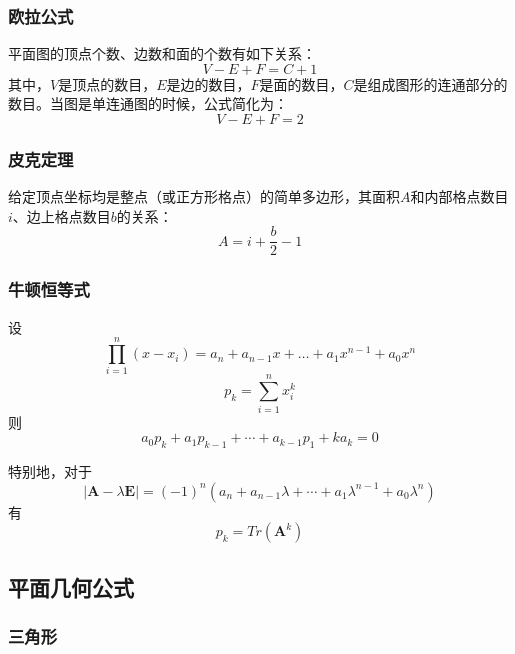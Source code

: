 \documentclass[a4paper]{ctexart}
\begin{document}
\subsubsection{欧拉公式}

平面图的顶点个数、边数和面的个数有如下关系：
$$V - E + F = C+ 1$$
\indent 其中，$V$是顶点的数目，$E$是边的数目，$F$是面的数目，$C$是组成图形的连通部分的数目。当图是单连通图的时候，公式简化为：
$$V - E + F = 2$$

\subsubsection{皮克定理}

给定顶点坐标均是整点（或正方形格点）的简单多边形，其面积$A$和内部格点数目$i$、边上格点数目$b$的关系：
$$A = i + \frac{b}{2} - 1$$

\subsubsection{牛顿恒等式}

设$$\prod_{i = 1}^n{(x - x_i)} = a_n + a_{n - 1} x + \dots + a_1 x^{n - 1} + a_0 x^n$$
$$p_k = \sum_{i = 1}^n{x_i^k}$$
则$$a_0 p_k + a_1 p_{k - 1} + \cdots + a_{k - 1} p_1 + k a_k = 0$$

特别地，对于$$|\bm{A} - \lambda \bm{E}| = (-1)^n(a_n + a_{n - 1} \lambda + \cdots + a_1 \lambda^{n - 1} + a_0 \lambda^n)$$
有$$p_k = Tr(\bm{A}^k)$$


\subsection{平面几何公式}

\subsubsection{三角形}
\end{document}

